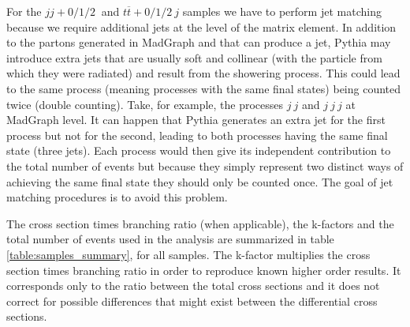 For the $jj+0/1/2 ~$ and $t\overline{t}+0/1/2 ~j$ samples we have to perform jet matching because we require additional jets at the level of the matrix element. In addition to the partons generated in MadGraph and that can produce a jet, Pythia may introduce extra jets that are usually soft and collinear (with the particle from which they were radiated) and result from the showering process. This could lead to the same process (meaning processes with the same final states) being counted twice (double counting). Take, for example, the processes $j~j$ and  $j~j~j$ at MadGraph level. It can happen that Pythia generates an extra jet for the first process but not for the second, leading to both processes having the same final state (three jets). Each process would then give its independent contribution to the total number of events but because they simply represent two distinct ways of achieving the same final state they should only be counted once. The goal of jet matching procedures is to avoid this problem. 


The cross section times branching ratio (when applicable), the k-factors and the total number of events used in the analysis are summarized in table \ref{table:samples_summary}, for all samples. The k-factor multiplies the cross section times branching ratio in order to reproduce known higher order results. It corresponds only to the ratio between the total cross sections and it does not correct for possible differences that might exist between the differential cross sections.

